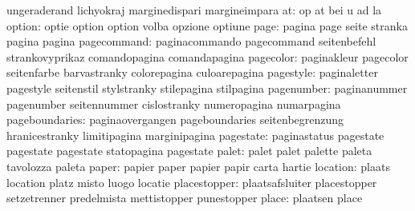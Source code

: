                            ungeraderand              lichyokraj
                           marginedispari            margineimpara
                       at: op                        at
                           bei                       u
                           ad                        la
                   option: optie                     option
                           option                    volba
                           opzione                   optiune
                     page: pagina                    page
                           seite                     stranka
                           pagina                    pagina
              pagecommand: paginacommando            pagecommand
                           seitenbefehl              strankovyprikaz
                           comandopagina             comandapagina
                pagecolor: paginakleur               pagecolor
                           seitenfarbe               barvastranky
                           colorepagina              culoarepagina
                pagestyle: paginaletter              pagestyle
                           seitenstil                stylstranky
                           stilepagina               stilpagina
               pagenumber: paginanummer              pagenumber
                           seitennummer              cislostranky
                           numeropagina              numarpagina
           pageboundaries: paginaovergangen          pageboundaries
                           seitenbegrenzung          hranicestranky
                           limitipagina              marginipagina
                pagestate: paginastatus              pagestate
                           pagestate                 pagestate
                           statopagina               pagestate %
                    palet: palet                     palet
                           palette                   paleta
                           tavolozza                 paleta
                    paper: papier                    paper
                           papier                    papir
                           carta                     hartie
                 location: plaats                    location
                           platz                     misto
                           luogo                     locatie
             placestopper: plaatsafsluiter           placestopper
                           setzetrenner              predelmista
                           mettistopper              punestopper %
                    place: plaatsen                  place

